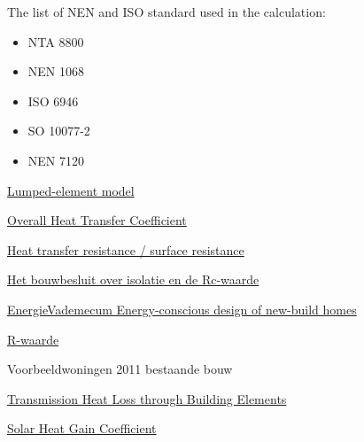 \documentclass[a4paper,10pt]{article}
\begin{document}
The list of NEN and ISO standard used in the calculation:

\begin{itemize}
    \item NTA 8800
    \item NEN 1068
    \item ISO 6946
    \item SO 10077-2
    \item NEN 7120
\end{itemize}
\newpage

\begin{thebibliography}{9}


\href{https://en.wikipedia.org/wiki/Lumped-element_model}{Lumped-element model}

\href{https://www.engineeringtoolbox.com/overall-heat-transfer-coefficient-d_434.html}{Overall Heat Transfer Coefficient}


\href{https://www.htflux.com/en/documentation/boundary-conditions/surface-resistance-heat-transfer-coefficient/}{Heat transfer resistance / surface resistance}


\href{https://www.isolatiemateriaal.nl/kenniscentrum/het-bouwbesluit-over-isolatie-en-rc-waarde/}{Het bouwbesluit over isolatie en de Rc-waarde}


\href{https://v-1isso-1nl-1y6tawt2z0091.stcproxy.han.nl/q/9d67bdb7/}{EnergieVademecum Energy-conscious design of new-build homes}


\href{https://www.joostdevree.nl/shtmls/r-waarde.shtml}{R-waarde}


 Voorbeeldwoningen 2011 bestaande bouw


\href{https://www.engineeringtoolbox.com/heat-loss-transmission-d_748.html}{Transmission Heat Loss through Building Elements}


\href{https://www.e-education.psu.edu/egee102/node/2019}{Solar Heat Gain Coefficient}



\end{thebibliography}
\end{document}

